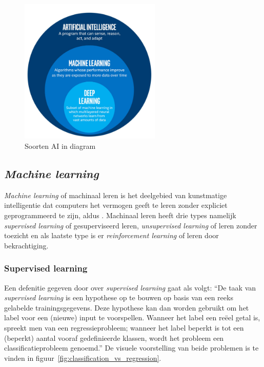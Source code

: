 \begin{figure}
    \centering
    \includegraphics[width=0.6\textwidth]{./img/ai_fields.png}
    \caption{\label{fig:soorten_ai_diagram} Soorten AI in diagram~\autocite{Bansal2019}}
\end{figure}

\subsection{\textit{Machine learning}}
\textit{Machine learning} of machinaal leren is het deelgebied van kunstmatige intelligentie dat computers het vermogen geeft te leren zonder expliciet geprogrammeerd te zijn, aldus \textcite{Lievens2021}. Machinaal leren heeft drie types namelijk \textit{supervised learning} of gesuperviseerd leren, \textit{unsupervised learning} of leren zonder toezicht en als laatste type is er \textit{reinforcement learning} of leren door bekrachtiging.

\subsubsection{Supervised learning}
Een defenitie gegeven door \textcite{Lievens2021} over \textit{supervised learning} gaat als volgt: ``De taak van \textit{supervised learning} is een hypothese op te bouwen op basis van een reeks gelabelde trainingsgegevens. Deze hypothese kan dan worden gebruikt om het label voor een (nieuwe) input te voorspellen. Wanneer het label een reëel getal is, spreekt men van een regressieprobleem; wanneer het label beperkt is tot een (beperkt) aantal vooraf gedefinieerde klassen, wordt het probleem een classificatieprobleem genoemd.''
De visuele voorstelling van beide problemen is te vinden in figuur~\ref{fig:classification_vs_regression}.

